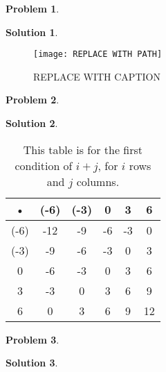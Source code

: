 \documentclass[10pt]{article}
\theoremstyle{plain}
\theoremstyle{definition}
\newtheorem{prob}{Problem}
\newtheorem*{sol}{Solution}
\theoremstyle{remark}
\begin{document}
\pagebreak

\begin{prob}

\end{prob}

\medskip

\begin{sol}

\end{sol}

\medskip

\begin{figure}[h]
\begin{center}
\texttt{[image:  REPLACE WITH PATH]} 
\end{center}
\caption{ REPLACE WITH CAPTION }
\end{figure}


\pagebreak

\begin{prob}

\end{prob}

\medskip

\begin{sol}

\end{sol}

\medskip

\begin{table}
\begin{center}
\begin{tabular}{|c|c|c|c|c|c|}
\hline 
• & (-6) & (-3) & 0 & 3 & 6 \\ 
\hline 
(-6) & -12 & -9 & -6 & -3 & 0 \\ 
\hline 
(-3) & -9 & -6 & -3 & 0 & 3 \\ 
\hline 
0 & -6 & -3 & 0 & 3 & 6 \\ 
\hline 
3 & -3 & 0 & 3 & 6 & 9 \\ 
\hline 
6 & 0 & 3 & 6 & 9 & 12 \\ 
\hline 
\end{tabular} 
\caption{This table is for the first condition of $i + j$, for $i$ rows and $j$ columns.}
\end{center}
\end{table}

\pagebreak

\begin{prob}

\end{prob}

\medskip

\begin{sol}

\end{sol}

\medskip

\begin{tikzpicture}

\end{tikzpicture}
\end{document}
